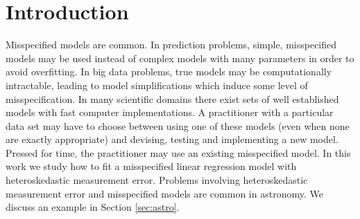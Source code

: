 \documentclass[ejs,ps,preprint]{imsart}
\numberwithin{equation}{section}
\theoremstyle{plain}
\begin{document}






\section{Introduction} 
\label{sec:intro}

Misspecified models are common. In prediction problems, simple, misspecified models may be used instead of complex models with many parameters in order to avoid overfitting. In big data problems, true models may be computationally intractable, leading to model simplifications which induce some level of misspecification. In many scientific domains there exist sets of well established models with fast computer implementations. A practitioner with a particular data set may have to choose between using one of these models (even when none are exactly appropriate) and devising, testing and implementing a new model. Pressed for time, the practitioner may use an existing misspecified model. In this work we study how to fit a misspecified linear regression model with heteroskedastic measurement error. Problems involving heteroskedastic measurement error and misspecified models are common in astronomy. We discuss an example in Section \ref{sec:astro}.
\end{document}
